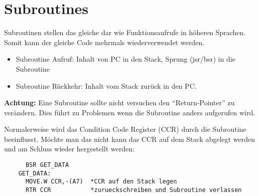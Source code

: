 \section{Subroutines}
Subroutinen stellen das gleiche dar wie Funktionsaufrufe in höheren Sprachen. Somit kann der gleiche Code mehrmals wiederverwendet werden.
\begin{itemize}
  \item Subroutine Aufruf: Inhalt von PC in den Stack, Sprung (jsr/bsr) in die Subroutine
  \item Subroutine Rückkehr: Inhalt vom Stack zurück in den PC.
\end{itemize}
\textbf{Achtung:} Eine Subroutine sollte nicht versuchen den "`Return-Pointer"' zu verändern. Dies führt zu Problemen wenn die Subroutine anders aufgerufen wird.

Normalerweise wird das Condition Code Register (CCR) durch die Subroutine beeinflusst. Möchte man das nicht kann das CCR auf dem Stack abgelegt werden und am Schluss wieder hergestellt werden: \\
\begin{lstlisting}
	  BSR GET_DATA
	GET_DATA: 
	  MOVE.W CCR,-(A7)  *CCR auf den Stack legen
	  RTR CCR           *zurueckschreiben und Subroutine verlassen
\end{lstlisting}

